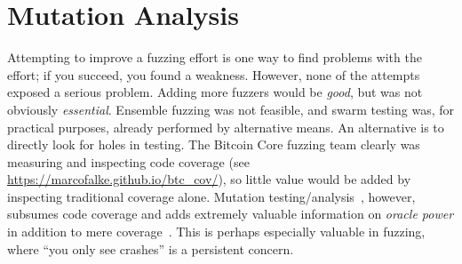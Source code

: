 \section{Mutation Analysis}

Attempting to improve a fuzzing effort is one way to find problems
with the effort; if you succeed, you found a weakness.  However, none
of the attempts exposed a serious problem.  Adding more fuzzers would
be \emph{good}, but was not obviously \emph{essential}.  Ensemble
fuzzing was not feasible, and swarm testing was, for practical
purposes, already performed by alternative means.  An alternative is
to directly look for holes in testing.  The Bitcoin Core fuzzing team
clearly was measuring and inspecting code coverage (see \url{https://marcofalke.github.io/btc_cov/}), so little value
would be added by inspecting traditional coverage alone.  Mutation
testing/analysis~\cite{MutationSurvey}, however, subsumes code coverage and adds extremely
valuable information on \emph{oracle power} in addition to mere
coverage~\cite{Discontents}.  This is perhaps especially valuable in fuzzing, where ``you
only see crashes'' is a persistent concern.

